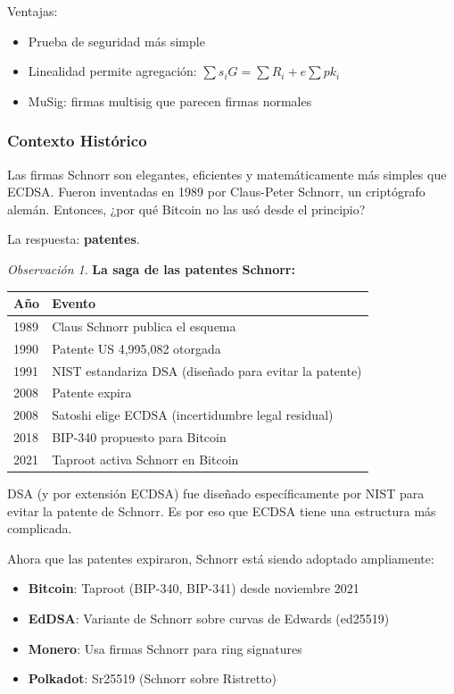 \documentclass[11pt,a4paper,twoside,openright]{book}
\theoremstyle{definition}
\theoremstyle{plain}
\theoremstyle{remark}
\newtheorem{remark}{Observación}[chapter]
\begin{document}
Ventajas:
\begin{itemize}
    \item Prueba de seguridad más simple
    \item Linealidad permite agregación: $\sum s_i G = \sum R_i + e \sum pk_i$
    \item MuSig: firmas multisig que parecen firmas normales
\end{itemize}

\subsubsection{Contexto Histórico}

\begin{intuicion}
Las firmas Schnorr son elegantes, eficientes y matemáticamente más simples que ECDSA. Fueron inventadas en 1989 por Claus-Peter Schnorr, un criptógrafo alemán. Entonces, ¿por qué Bitcoin no las usó desde el principio?

La respuesta: \textbf{patentes}.
\end{intuicion}

\begin{remark}
\textbf{La saga de las patentes Schnorr:}

\begin{center}
\begin{tabular}{ll}
\toprule
\textbf{Año} & \textbf{Evento} \\
\midrule
1989 & Claus Schnorr publica el esquema \\
1990 & Patente US 4,995,082 otorgada \\
1991 & NIST estandariza DSA (diseñado para evitar la patente) \\
2008 & Patente expira \\
2008 & Satoshi elige ECDSA (incertidumbre legal residual) \\
2018 & BIP-340 propuesto para Bitcoin \\
2021 & Taproot activa Schnorr en Bitcoin \\
\bottomrule
\end{tabular}
\end{center}

DSA (y por extensión ECDSA) fue diseñado específicamente por NIST para evitar la patente de Schnorr. Es por eso que ECDSA tiene una estructura más complicada.
\end{remark}

\begin{keyidea}
Ahora que las patentes expiraron, Schnorr está siendo adoptado ampliamente:
\begin{itemize}
    \item \textbf{Bitcoin}: Taproot (BIP-340, BIP-341) desde noviembre 2021
    \item \textbf{EdDSA}: Variante de Schnorr sobre curvas de Edwards (ed25519)
    \item \textbf{Monero}: Usa firmas Schnorr para ring signatures
    \item \textbf{Polkadot}: Sr25519 (Schnorr sobre Ristretto)
\end{itemize}
\end{keyidea}
\end{document}
